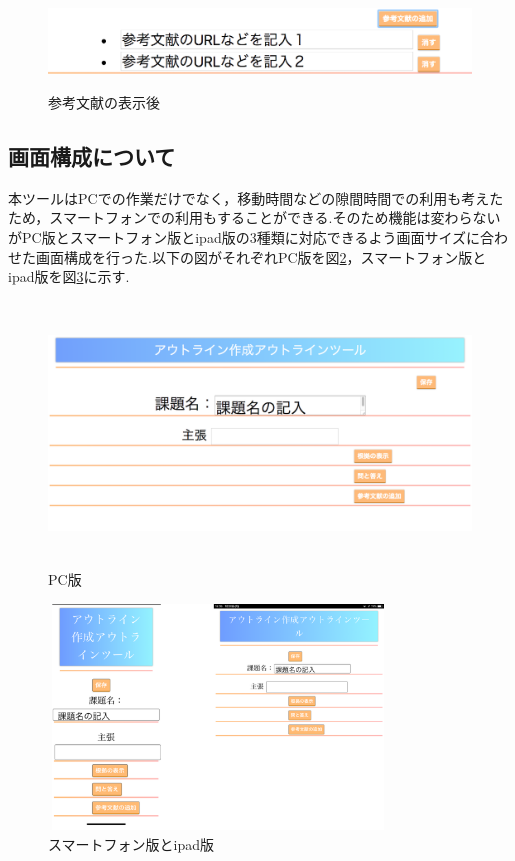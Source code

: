 \documentclass[a4j,12pt]{jarticle}
\begin{document}
\begin{figure}[h]
\begin{center}
 \includegraphics[clip,width=150mm,height=25mm]{figure/07sankou.png}
\end{center}
 \caption{参考文献の表示後}
 \label{fig:o}
\end{figure}

\newpage
\subsection{画面構成について}
本ツールはPCでの作業だけでなく，移動時間などの隙間時間での利用も考えたため，スマートフォンでの利用もすることができる.そのため機能は変わらないがPC版とスマートフォン版とipad版の3種類に対応できるよう画面サイズに合わせた画面構成を行った.以下の図がそれぞれPC版を図\ref{fig:p}，スマートフォン版とipad版を図\ref{fig:q}に示す.
\begin{figure}[h]
\begin{center}
 \includegraphics[clip,width=130mm,height=70mm]{figure/08gamen.png}
\end{center}
 \caption{PC版}
 \label{fig:p}
\end{figure}

\begin{figure}[h]
\begin{center}
 \includegraphics[clip,width=90mm,height=60mm]{figure/17.png}
\end{center}
 \caption{スマートフォン版とipad版}
 \label{fig:q}
\end{figure}
\end{document}
